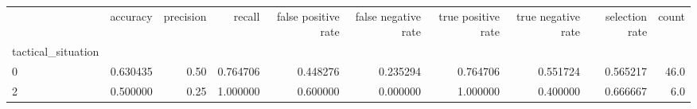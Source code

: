 \begin{tabular}{lrrrrrrrrr}
\toprule
{} &  accuracy &  precision &    recall &  false positive rate &  false negative rate &  true positive rate &  true negative rate &  selection rate &  count \\
tactical\_situation &           &            &           &                      &                      &                     &                     &                 &        \\
\midrule
0                  &  0.630435 &       0.50 &  0.764706 &             0.448276 &             0.235294 &            0.764706 &            0.551724 &        0.565217 &   46.0 \\
2                  &  0.500000 &       0.25 &  1.000000 &             0.600000 &             0.000000 &            1.000000 &            0.400000 &        0.666667 &    6.0 \\
\bottomrule
\end{tabular}
